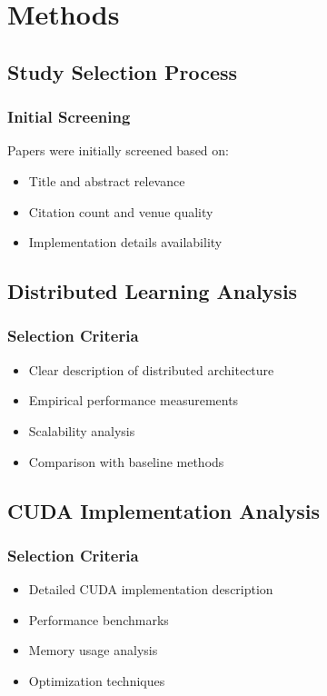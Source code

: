 \section{Methods}
\label{sec:methods}

\subsection{Study Selection Process}
\subsubsection{Initial Screening}
Papers were initially screened based on:
\begin{itemize}
    \item Title and abstract relevance
    \item Citation count and venue quality
    \item Implementation details availability
\end{itemize}

\subsection{Distributed Learning Analysis}
\subsubsection{Selection Criteria}
\begin{itemize}
    \item Clear description of distributed architecture
    \item Empirical performance measurements
    \item Scalability analysis
    \item Comparison with baseline methods
\end{itemize}

\subsection{CUDA Implementation Analysis}
\subsubsection{Selection Criteria}
\begin{itemize}
    \item Detailed CUDA implementation description
    \item Performance benchmarks
    \item Memory usage analysis
    \item Optimization techniques
\end{itemize}



